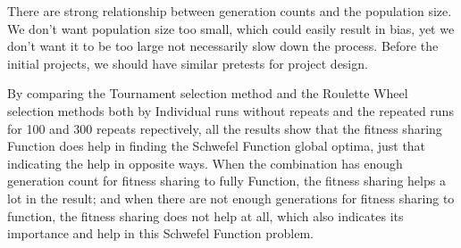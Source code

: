 \documentclass[10pt,b5paper]{article}
\begin{document}
There are strong relationship between generation counts and the population size. We don't want population size too small, which could easily result in bias, yet we don't want it to be too large not necessarily slow down the process. Before the initial projects, we should have similar pretests for project design.

By comparing the Tournament selection method and the Roulette Wheel selection methods both by Individual runs without repeats and the repeated runs for 100 and 300 repeats repectively, all the results show that the fitness sharing Function does help in finding the Schwefel Function global optima, just that indicating the help in opposite ways. When the combination has enough generation count for fitness sharing to fully Function, the fitness sharing helps a lot in the result; and when there are not enough generations for fitness sharing to function, the fitness sharing does not help at all, which also indicates its importance and help in this Schwefel Function problem. 
\end{document}
